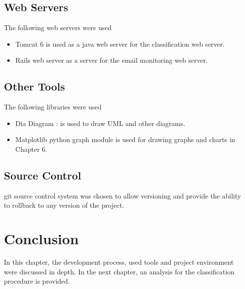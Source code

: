 \subsection{Web Servers}
The following web servers were used
\begin{itemize}
  \item Tomcat 6 is used as a java web server for the classification web server.
  \item Rails web server as a server for the email monitoring web server.
\end{itemize}

\subsection{Other Tools}
The following libraries were used
\begin{itemize}
  \item Dia Diagram : is used to draw UML and other diagrams.
  \item Matplotlib python graph module is used for drawing graphs and charts in Chapter 6.
\end{itemize}

\subsection{Source Control}
git source control system \cite{GIT} was chosen to allow versioning and provide 
the ability to rollback to any version of the project.
\section{Conclusion}
\label{sec:conclusion_5}
In this chapter, the development process, used tools and project environment were 
discussed in depth. In the next chapter, an analysis for the classification 
procedure is provided.
